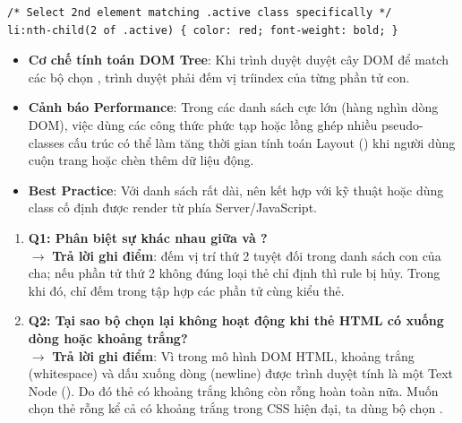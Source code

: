 \begin{codeWindow}
\begin{lstlisting}[language=CSS3]
/* Select 2nd element matching .active class specifically */
li:nth-child(2 of .active) { color: red; font-weight: bold; }
\end{lstlisting}
\end{codeWindow}

\begin{warnBox}
\begin{itemize}[leftmargin=1.5em, itemsep=3pt, parsep=0pt]
    \item \textbf{Cơ chế tính toán DOM Tree}: Khi trình duyệt duyệt cây DOM để match các bộ chọn , trình duyệt phải đếm vị tríindex của từng phần tử con.
    \item \textbf{Cảnh báo Performance}: Trong các danh sách cực lớn (hàng nghìn dòng DOM), việc dùng các công thức phức tạp hoặc lồng ghép nhiều pseudo-classes cấu trúc có thể làm tăng thời gian tính toán Layout () khi người dùng cuộn trang hoặc chèn thêm dữ liệu động.
    \item \textbf{Best Practice}: Với danh sách rất dài, nên kết hợp với kỹ thuật  hoặc dùng class cố định được render từ phía Server/JavaScript.
\end{itemize}
\end{warnBox}

\begin{tipBox}
\begin{enumerate}[leftmargin=1.5em, itemsep=4pt, parsep=0pt]
    \item \textbf{Q1: Phân biệt sự khác nhau giữa  và ?} \\
    $\rightarrow$ \textbf{Trả lời ghi điểm}:  đếm vị trí thứ 2 tuyệt đối trong danh sách con của cha; nếu phần tử thứ 2 không đúng loại thẻ chỉ định thì rule bị hủy. Trong khi đó,  chỉ đếm trong tập hợp các phần tử cùng kiểu thẻ.
    \item \textbf{Q2: Tại sao bộ chọn  lại không hoạt động khi thẻ HTML có xuống dòng hoặc khoảng trắng?} \\
    $\rightarrow$ \textbf{Trả lời ghi điểm}: Vì trong mô hình DOM HTML, khoảng trắng (whitespace) và dấu xuống dòng (newline) được trình duyệt tính là một Text Node (). Do đó thẻ có khoảng trắng không còn rỗng hoàn toàn nữa. Muốn chọn thẻ rỗng kể cả có khoảng trắng trong CSS hiện đại, ta dùng bộ chọn .
\end{enumerate}
\end{tipBox}


